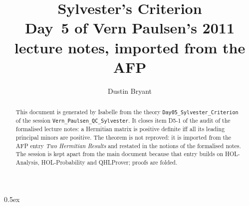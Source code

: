 \documentclass[11pt,a4paper]{article}
\theoremstyle{definition}
\begin{document}
\title{Sylvester's Criterion\\[0.5em]
  \large Day~5 of Vern Paulsen's 2011 lecture notes, imported from the AFP}
\author{Dustin Bryant}
\maketitle

\begin{abstract}
This document is generated by Isabelle from the theory \texttt{Day05\_Sylvester\_Criterion}
of the session \texttt{Vern\_Paulsen\_QC\_Sylvester}.  It closes item D5-1 of the audit of the
formalised lecture notes: a Hermitian matrix is positive definite iff all its leading
principal minors are positive.  The theorem is not reproved: it is imported from the AFP
entry \emph{Two Hermitian Results} and restated in the notions of the formalised notes.
The session is kept apart from the main document because that entry builds on
HOL-Analysis, HOL-Probability and QHLProver; proofs are folded.
\end{abstract}

\parindent 0pt\parskip 0.5ex


\end{document}
